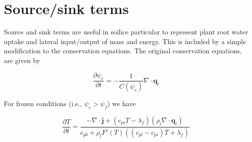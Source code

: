 \documentclass[10pt,a4paper]{article}
\begin{document}
%
%
%
%
%
%
%
%
%
%
%
%
%
%
%
%

%

\newpage

\section{Source/sink terms}

Source and sink terms are useful in soilice particular to represent plant root water uptake and lateral input/output of mass and energy. This is included by a simple modification to the conservation equations. The original conservation equations, are given by

\begin{equation}
\frac{\partial \psi_e}{\partial t}=-\frac{1}{C(\psi_e)}\nabla\cdot\mathbf{q}_l
\end{equation}

For frozen conditions (i.e., $\psi_e>\psi_f$) we have

\begin{equation}
\frac{\partial T}{\partial t} = \frac{-\nabla\cdot\mathbf{j}+(c_{pi}T-\lambda_f)(\rho_l\nabla\cdot\mathbf{q}_l)}{c_{pb}+\rho_lF'(T)((c_{pl}-c_{pi})T+\lambda_f)}
\end{equation}
\end{document}

